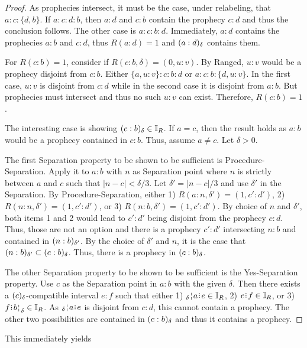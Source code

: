 \documentclass[12pt]{article}
\begin{document}
\begin{proof}
    As prophecies intersect, it must be the case, under relabeling, that $a:c:\{d,b\}$. If $a:c:d:b$, then $a:d$ and $c:b$ contain the prophecy $c:d$ and thus the conclusion follows. The other case is $a:c:b:d$. Immediately, $a:d$ contains the prophecies $a:b$ and $c:d$, thus $R(a:d)=1$ and $\halo{a:d}$ contains them.  
    
    For $R(c:b)=1$, consider if $R(c:b, \delta) = (0, u:v)$. By Ranged, $u:v$ would be a prophecy disjoint from $c:b$. Either $\{a, u:v\}:c:b:d$ or $a:c:b:\{d, u:v\}$. In the first case, $u:v$ is disjoint from $c:d$ while in the second case it is disjoint from $a:b$. But prophecies must intersect and thus no such $u:v$ can exist. Therefore, $R(c:b) = 1$.
    
    The interesting case is showing $\halo{c:b} \in \mathbb{I}_R$. If $a=c$, then the result holds as $a:b$ would be a prophecy contained in $c:b$. Thus, assume $a \neq c$. Let $\delta >0$. 
    
    The first Separation property to be shown to be sufficient is Procedure-Separation. Apply it to $a:b$ with $n$ as Separation point where $n$ is strictly between $a$ and $c$ such that $|n-c| < \delta/3$. Let $\delta' = |n-c|/3$ and use $\delta'$ in the Separation. By Procedure-Separation, either 1) $R(a:n, \delta') = (1, c':d')$, 2) $R(n:n, \delta') = (1, c':d')$,  or 3) $R(n:b, \delta') = (1, c':d')$. By choice of $n$ and $\delta'$, both items 1 and 2 would lead to $c':d'$ being disjoint from the prophecy $c:d$. Thus, those are not an option and there is a prophecy $c':d'$ intersecting $n:b$ and contained in $\halo[\delta']{n:b}$. By the choice of $\delta'$ and $n$, it is the case that $\halo[\delta']{n:b} \subset \halo{c:b}$. Thus, there is a prophecy in $\halo{c:b}$.

    The other Separation property to be shown to be sufficient is the Yes-Separation property. Use $c$ as the Separation point in $a:b$ with the given $\delta$. Then there exists a $\halo{c}$-compatible interval $e:f$ such that either 1) $\fuzbleft{a}\rint e \in \mathbb{I}_R$, 2) $e\rint f \in \mathbb{I}_R$,  or 3) $f\rint \fuzbright{b} \in \mathbb{I}_R$. As $\fuzbleft{a}\rint e$ is disjoint from $c:d$, this cannot contain a prophecy. The other two possibilities are contained in $\halo{c:b}$ and thus it contains a prophecy. 
    
\end{proof}

This immediately yields
\end{document}

